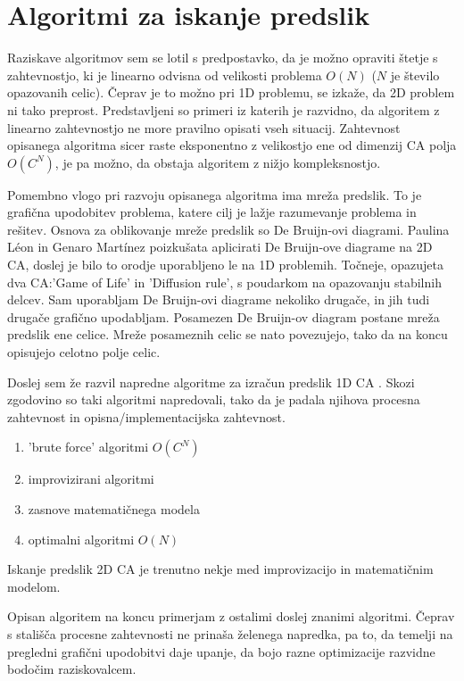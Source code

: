 \documentclass[12pt,a4paper,openany,twoside]{book}
\begin{document}
\section{Algoritmi za iskanje predslik}

Raziskave algoritmov sem se lotil s predpostavko, da je možno opraviti štetje s zahtevnostjo,
ki je linearno odvisna od velikosti problema \( O(N) \)  (\(N\) je število opazovanih celic).
Čeprav je to možno pri 1D problemu, se izkaže, da 2D problem ni tako preprost.
Predstavljeni so primeri iz katerih je razvidno,
da algoritem z linearno zahtevnostjo ne more pravilno opisati vseh situacij.
Zahtevnost opisanega algoritma sicer raste eksponentno z velikostjo ene
od dimenzij CA polja \( O(C^N) \), je pa možno, da obstaja algoritem z nižjo kompleksnostjo.

Pomembno vlogo pri razvoju opisanega algoritma ima mreža predslik.
To je grafična upodobitev problema, katere cilj je lažje razumevanje problema in rešitev.
Osnova za oblikovanje mreže predslik so De Bruijn-ovi diagrami.
Paulina Léon in Genaro Martínez \cite{PaulinaGenaro2016}
poizkušata aplicirati De Bruijn-ove diagrame na 2D CA,
doslej je bilo to orodje uporabljeno le na 1D problemih.
Točneje, opazujeta dva CA:'Game of Life' in 'Diffusion rule',
s poudarkom na opazovanju stabilnih delcev.
Sam uporabljam De Bruijn-ovi diagrame nekoliko drugače,
in jih tudi drugače grafično upodabljam.
Posamezen De Bruijn-ov diagram postane mreža predslik ene celice.
Mreže posameznih celic se nato povezujejo,
tako da na koncu opisujejo celotno polje celic.

Doslej sem že razvil napredne algoritme za izračun predslik 1D CA \cite{JerasDobnikar2007}.
Skozi zgodovino so taki algoritmi napredovali, tako da je padala njihova
procesna zahtevnost in opisna/implementacijska zahtevnost.
\begin{enumerate}
 \item 'brute force' algoritmi \( O(C^N) \)
 \item improvizirani algoritmi
 \item zasnove matematičnega modela
 \item optimalni algoritmi \( O(N) \)
\end{enumerate}
Iskanje predslik 2D CA je trenutno nekje med improvizacijo in matematičnim modelom.

Opisan algoritem na koncu primerjam z ostalimi doslej znanimi algoritmi.
Čeprav s stališča procesne zahtevnosti ne prinaša želenega napredka,
pa to, da temelji na pregledni grafični upodobitvi daje upanje,
da bojo razne optimizacije razvidne bodočim raziskovalcem.
\end{document}

